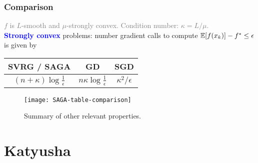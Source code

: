 \documentclass[aspectratio=149]{beamer}
\begin{document}
\begin{frame}
  \frametitle{Comparison}



  \textcolor{gray}{$f$ is $L$-smooth and $\mu$-strongly convex. Condition number: $\kappa = L/\mu$.}\\
  \textbf{\textcolor{blue}{Strongly convex}} problems: number gradient calls to compute $\mathbb{E} [f(x_k)] - f^* \le \epsilon$ is given by
  \begin{center}
    \begin{tabular}{c c c}
      SVRG / SAGA  & GD & SGD \\
      \midrule
      $(n + \kappa) \log \frac{1}{\epsilon}$ & $n \kappa \log \frac{1}{\epsilon}$ & $\kappa^2 / \epsilon$
    \end{tabular}
  \end{center}
  \vspace{1cm}
  \begin{figure}[ht]
    \centering
    \texttt{[image: SAGA-table-comparison]}
    \caption{Summary of other relevant properties.}
  \end{figure}


\end{frame}

\section{Katyusha}%
\label{sec:}
\end{document}
